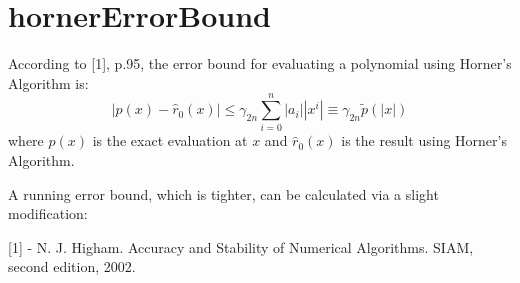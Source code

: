 \documentclass[17pt,a4paper]{extarticle}
\begin{document}
\section{hornerErrorBound}

According to [1], p.95, the error bound for evaluating a polynomial using Horner's Algorithm is:
\[
	\left|p(x) - \hat{r}_0(x)\right| \leq \gamma_{2n}\sum_{i=0}^n\left|a_i\right|\left|x^i\right| \equiv \gamma_{2n}\tilde{p}(|x|)
\]
where $p(x)$ is the exact evaluation at $x$ and $\hat{r}_0(x)$ is the result using Horner's Algorithm.

A running error bound, which is tighter, can be calculated via a slight modification:



[1] - N. J. Higham. Accuracy and Stability of Numerical Algorithms. SIAM, second edition, 2002.
\end{document}
